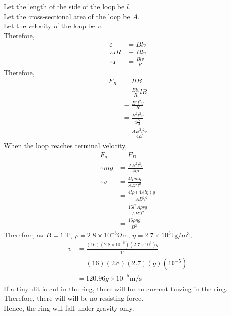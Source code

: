 \documentclass[fleqn, a4paper, 11pt, oneside]{amsart}
\theoremstyle{definition}
\theoremstyle{theorem}
\begin{document}
\begin{solution}
	Let the length of the side of the loop be $l$.\\
	Let the cross-sectional area of the loop be $A$.\\
	Let the velocity of the loop be $v$.\\
	Therefore,
	\begin{align*}
		\varepsilon &= B l v\\
		\therefore I R &= B l v\\
		\therefore I &= \frac{B l v}{R}
	\end{align*}
	Therefore,
	\begin{align*}
		F_B &= I l B\\
		&= \frac{B l v}{R} l B\\
		&= \frac{B^2 l^2 v}{R}\\
		&= \frac{B^2 l^2 v}{4 \frac{\rho l}{A}}\\
		&= \frac{A B^2 l^2 v}{4 \rho l}
	\end{align*}
	When the loop reaches terminal velocity,
	\begin{align*}
		F_g &= F_B\\
		\therefore m g &= \frac{A B^2 l^2 v}{4 l \rho}\\
		\therefore v &= \frac{4 l \rho m g}{A B^2 l^2}\\
		&= \frac{4 l \rho (4 A l \eta) g }{A B^2 l^2}\\
		&= \frac{16 l^2 A \rho \eta g}{A B^2 l^2}\\
		&= \frac{16 \rho \eta g}{B^2}
	\end{align*}
	Therefore, as $B = 1 \tesla$, $\rho = 2.8 \times 10^{-8} \si{\ohm\metre}$, $\eta = 2.7 \times 10^3 \si{\kg\per\metre\cubed}$,\\
	\begin{align*}
		v &= \frac{(16) \left( 2.8 \times 10^{-8} \right) \left( 2.7 \times 10^3 \right) g}{1^2}\\
		&= (16) (2.8) (2.7) (g) \left( 10^{-5} \right)\\
		&= 120.96 g \times 10^{-5} \si{\metre\per\second}
	\end{align*}
	If a tiny slit is cut in the ring, there will be no current flowing in the ring.\\
	Therefore, there will will be no resisting force.\\
	Hence, the ring will fall under gravity only.
\end{solution}
\end{document}
